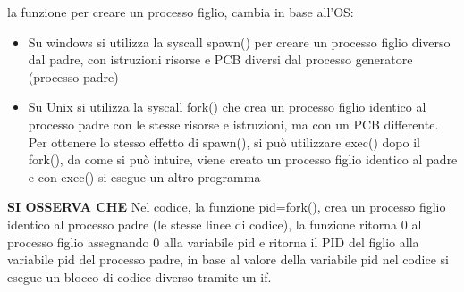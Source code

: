 \documentclass{article}
\begin{document}
        \begin{tcolorbox}[colback= green!10!white, colframe=green!40!black, title= fork() e spawn()]
            la funzione per creare un processo figlio, cambia in base all'OS:

            \begin{itemize}
                
                \item Su windows si utilizza la syscall spawn() per creare un processo figlio diverso dal padre, con istruzioni risorse e PCB diversi dal processo generatore (processo padre)
                
                \item Su Unix si utilizza la syscall fork() che crea un processo figlio identico al processo padre con le stesse risorse e istruzioni, ma con un PCB differente. Per ottenere lo stesso effetto di spawn(), si può utilizzare exec() dopo il fork(), da come si può intuire, viene creato un processo figlio identico al padre e con exec() si esegue un altro programma
            \end{itemize}
        \end{tcolorbox}
        \textbf{SI OSSERVA CHE}
        Nel codice, la funzione pid=fork(), crea un processo figlio identico al processo padre (le stesse linee di codice), la funzione ritorna 0 al processo figlio assegnando 0 alla variabile pid e ritorna il PID del figlio alla variabile pid del processo padre, in base al valore della variabile pid nel codice si esegue un blocco di codice diverso tramite un if. 
        
\end{document}
